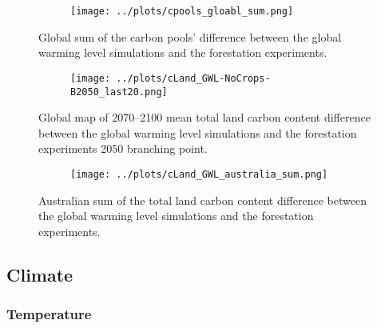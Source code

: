 \documentclass[]{article}
\begin{document}
\begin{figure}[H]
    \centering
    \begin{subfigure}[b]{\linewidth}
        \texttt{[image: ../plots/cpools\_gloabl\_sum.png]}
    \end{subfigure}
    \caption{Global sum of the carbon pools' difference between the global warming level simulations and the forestation experiments.}
    \label{fig:global_cpools}
\end{figure}

\begin{figure}[H]
    \centering
    \begin{subfigure}[b]{\linewidth}
        \texttt{[image: ../plots/cLand\_GWL-NoCrops-B2050\_last20.png]}
    \end{subfigure}
    \caption{Global map of 2070--2100 mean total land carbon content difference between the global warming level simulations and the forestation experiments 2050 branching point.}
    \label{fig:map_cLand}
\end{figure}


\begin{figure}[H]
    \centering
    \begin{subfigure}[b]{\linewidth}
        \texttt{[image: ../plots/cLand\_GWL\_australia\_sum.png]}
    \end{subfigure}
    \caption{Australian sum of the total land carbon content difference between the global warming level simulations and the forestation experiments.}
    \label{fig:australia_cLand}
\end{figure}

\subsection{Climate}

\subsubsection{Temperature}
\end{document}
